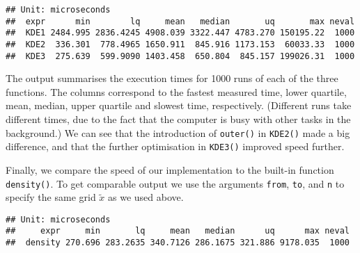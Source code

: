 \documentclass[
  a4paper,
]{article}
\newenvironment{Shaded}{\begin{snugshade}}{\end{snugshade}}
\newcommand{\AttributeTok}[1]{\textcolor[rgb]{0.77,0.63,0.00}{#1}}
\newcommand{\ControlFlowTok}[1]{\textcolor[rgb]{0.13,0.29,0.53}{\textbf{#1}}}
\newcommand{\DecValTok}[1]{\textcolor[rgb]{0.00,0.00,0.81}{#1}}
\newcommand{\FunctionTok}[1]{\textcolor[rgb]{0.00,0.00,0.00}{#1}}
\newcommand{\NormalTok}[1]{#1}
\newcommand{\OtherTok}[1]{\textcolor[rgb]{0.56,0.35,0.01}{#1}}
\newcommand{\SpecialCharTok}[1]{\textcolor[rgb]{0.00,0.00,0.00}{#1}}
\newcommand{\StringTok}[1]{\textcolor[rgb]{0.31,0.60,0.02}{#1}}
\theoremstyle{definition}
\theoremstyle{definition}
\theoremstyle{definition}
\theoremstyle{definition}
\theoremstyle{remark}
\begin{document}
\begin{verbatim}
## Unit: microseconds
##  expr      min        lq     mean   median       uq       max neval
##  KDE1 2484.995 2836.4245 4908.039 3322.447 4783.270 150195.22  1000
##  KDE2  336.301  778.4965 1650.911  845.916 1173.153  60033.33  1000
##  KDE3  275.639  599.9090 1403.458  650.804  845.157 199026.31  1000
\end{verbatim}

The output summarises the execution times for 1000 runs of each of the
three functions. The columns correspond to the fastest measured time,
lower quartile, mean, median, upper quartile and slowest time, respectively.
(Different runs take different times, due to the fact that the computer
is busy with other tasks in the background.) We can see that the introduction
of \texttt{outer()} in \texttt{KDE2()} made a big difference, and that the further
optimisation in \texttt{KDE3()} improved speed further.

Finally, we compare the speed of our implementation to the built-in
function \texttt{density()}. To get comparable output we use the arguments
\texttt{from}, \texttt{to}, and \texttt{n} to specify the same grid \(\tilde x\)
as we used above.

\begin{Shaded}
\end{Shaded}

\begin{verbatim}
## Unit: microseconds
##     expr     min       lq     mean   median      uq      max neval
##  density 270.696 283.2635 340.7126 286.1675 321.886 9178.035  1000
\end{verbatim}
\end{document}
